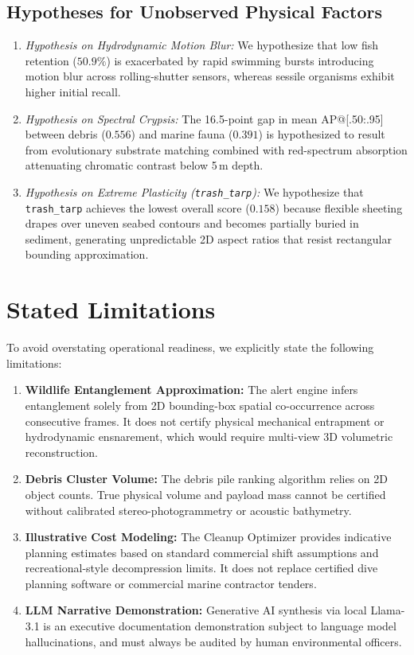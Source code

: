 \documentclass[conference]{IEEEtran}
\begin{document}
\subsection{Hypotheses for Unobserved Physical Factors}
\begin{enumerate}
    \item \emph{Hypothesis on Hydrodynamic Motion Blur:} We hypothesize that low fish retention ($50.9\%$) is exacerbated by rapid swimming bursts introducing motion blur across rolling-shutter sensors, whereas sessile organisms exhibit higher initial recall.
    \item \emph{Hypothesis on Spectral Crypsis:} The 16.5-point gap in mean AP@[.50:.95] between debris ($0.556$) and marine fauna ($0.391$) is hypothesized to result from evolutionary substrate matching combined with red-spectrum absorption attenuating chromatic contrast below 5\,m depth.
    \item \emph{Hypothesis on Extreme Plasticity (\texttt{trash\_tarp}):} We hypothesize that \texttt{trash\_tarp} achieves the lowest overall score ($0.158$) because flexible sheeting drapes over uneven seabed contours and becomes partially buried in sediment, generating unpredictable 2D aspect ratios that resist rectangular bounding approximation.
\end{enumerate}

\section{Stated Limitations}

To avoid overstating operational readiness, we explicitly state the following limitations:
\begin{enumerate}
    \item \textbf{Wildlife Entanglement Approximation:} The alert engine infers entanglement solely from 2D bounding-box spatial co-occurrence across consecutive frames. It does not certify physical mechanical entrapment or hydrodynamic ensnarement, which would require multi-view 3D volumetric reconstruction.
    \item \textbf{Debris Cluster Volume:} The debris pile ranking algorithm relies on 2D object counts. True physical volume and payload mass cannot be certified without calibrated stereo-photogrammetry or acoustic bathymetry.
    \item \textbf{Illustrative Cost Modeling:} The Cleanup Optimizer provides indicative planning estimates based on standard commercial shift assumptions and recreational-style decompression limits. It does not replace certified dive planning software or commercial marine contractor tenders.
    \item \textbf{LLM Narrative Demonstration:} Generative AI synthesis via local Llama-3.1 is an executive documentation demonstration subject to language model hallucinations, and must always be audited by human environmental officers.
\end{enumerate}
\end{document}
